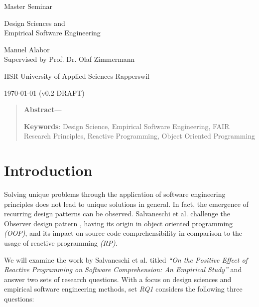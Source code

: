 \documentclass[12pt,a4paper]{article}
\newcommand{\version}{v0.2 DRAFT}
\begin{document}
\begin{centering}
	\Large{Master Seminar}
	\par
	\Huge{Design Sciences and\\Empirical Software Engineering}
	\par
	\vspace{2ex}

	\normalsize{
		Manuel Alabor\\
		Supervised by Prof. Dr. Olaf Zimmermann\\
		\par
		\vspace{2ex}
		HSR University of Applied Sciences Rapperswil\\
		\par
		\vspace{2ex}
		\today{} (\version)
	}
	\par
	\vspace{2ex}

	\begin{quotation}
		\small{
			\textbf{Abstract}---
		}
		\par
		\vspace{2ex}

		\small{
			\textbf{Keywords}: Design Science, Empirical Software Engineering, FAIR Research Principles, Reactive Programming, Object Oriented Programming
		}
		\par
		\vspace{4ex}
	\end{quotation}
\end{centering}

\section{Introduction}
Solving unique problems through the application of software engineering principles does not lead to unique solutions in general. In fact, the emergence of recurring design patterns can be observed. Salvaneschi et al. \cite{7827078} challenge the Observer design pattern \cite{gamma1995design}, having its origin in object oriented programming \emph{(OOP)}, and its impact on source code comprehensibility in comparison to the usage of reactive programming \emph{(RP)}.

We will examine the work by Salvaneschi et al. titled \emph{``On the Positive Effect of Reactive Programming on Software Comprehension: An Empirical Study''} \cite{7827078} and answer two sets of research questions. With a focus on design sciences and empirical software engineering methods, set \emph{RQ1} considers the following three questions:
\end{document}
